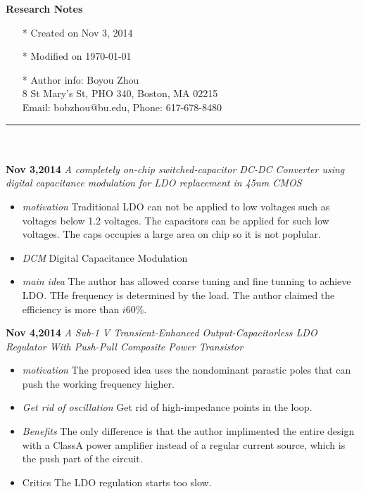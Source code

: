 \documentclass[]{article}
\begin{document}
\pagestyle{empty}
{\large\textbf{Research Notes}}
\begin{itemize}
    \item[*] Created on Nov 3, 2014
    \item[*] Modified on \today
    \item[*] Author info: Boyou Zhou\\
             8 St Mary's St, PHO 340, Boston, MA 02215\\
             Email: bobzhou@bu.edu, Phone: 617-678-8480
\end{itemize}


\rule[-0.1cm]{7.5in}{0.01cm}\\
\\
\noindent \textbf{Nov 3,2014}
\textit{A completely on-chip switched-capacitor DC-DC Converter using digital
capacitance modulation for LDO replacement in 45nm CMOS}
\indent		\begin{itemize}
            \item \textit{motivation} Traditional LDO can not be applied to low
            voltages such as voltages below 1.2 voltages. The capacitors can be
            applied for such low voltages. The caps occupies a large area on
            chip so it is not poplular.
            \item \textit{DCM} Digital Capacitance Modulation
            \item \textit{main idea} The author has allowed coarse tuning and
            fine tunning to achieve LDO. THe frequency is determined by the
            load. The author claimed the efficiency is more than $i60\%$.
        \end{itemize}


\noindent \textbf{Nov 4,2014}
\textit{A Sub-1 V Transient-Enhanced Output-Capacitorless LDO Regulator With
Push-Pull Composite Power Transistor}
\indent		\begin{itemize}
            \item \textit{motivation} The proposed idea uses the nondominant
            parastic poles that can push the working frequency higher.
            \item \textit{Get rid of oscillation} Get rid of high-impedance
            points in the loop.
            \item \textit{Benefits} The only difference is that the author
            implimented the entire design with a ClassA power amplifier instead
            of a regular current source, which is the push part of the circuit.
            \item {Critics} The LDO regulation starts too slow.
       		\end{itemize}
\end{document}
